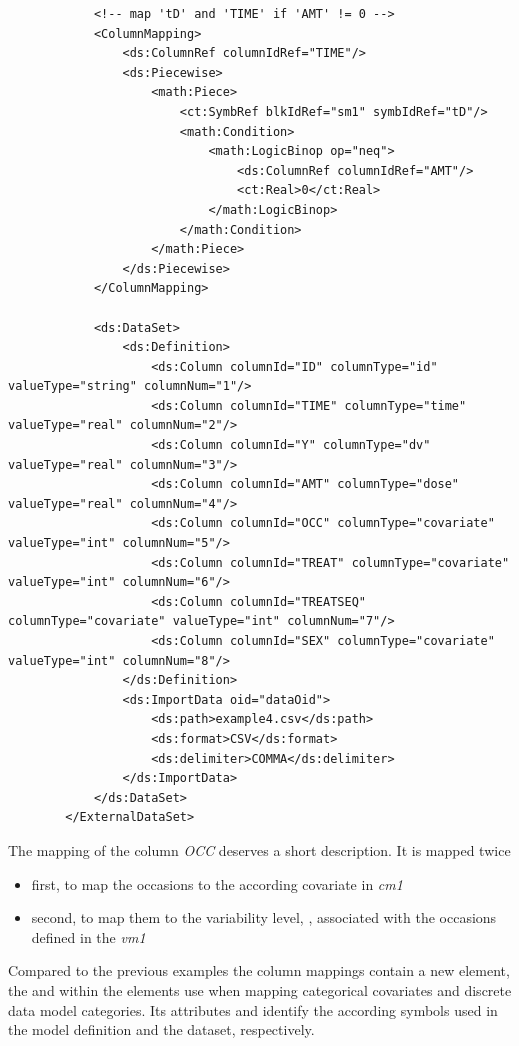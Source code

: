 \begin{lstlisting}
            <!-- map 'tD' and 'TIME' if 'AMT' != 0 -->
            <ColumnMapping>
                <ds:ColumnRef columnIdRef="TIME"/>
                <ds:Piecewise>
                    <math:Piece>
                        <ct:SymbRef blkIdRef="sm1" symbIdRef="tD"/>
                        <math:Condition>
                            <math:LogicBinop op="neq">
                                <ds:ColumnRef columnIdRef="AMT"/>
                                <ct:Real>0</ct:Real>
                            </math:LogicBinop>
                        </math:Condition>
                    </math:Piece>
                </ds:Piecewise>
            </ColumnMapping>

            <ds:DataSet>
                <ds:Definition>
                    <ds:Column columnId="ID" columnType="id" valueType="string" columnNum="1"/>
                    <ds:Column columnId="TIME" columnType="time" valueType="real" columnNum="2"/>
                    <ds:Column columnId="Y" columnType="dv" valueType="real" columnNum="3"/>
                    <ds:Column columnId="AMT" columnType="dose" valueType="real" columnNum="4"/>
                    <ds:Column columnId="OCC" columnType="covariate" valueType="int" columnNum="5"/>
                    <ds:Column columnId="TREAT" columnType="covariate" valueType="int" columnNum="6"/>
                    <ds:Column columnId="TREATSEQ" columnType="covariate" valueType="int" columnNum="7"/>
                    <ds:Column columnId="SEX" columnType="covariate" valueType="int" columnNum="8"/>
                </ds:Definition>
                <ds:ImportData oid="dataOid">
                    <ds:path>example4.csv</ds:path>
                    <ds:format>CSV</ds:format>
                    <ds:delimiter>COMMA</ds:delimiter>
                </ds:ImportData>
            </ds:DataSet>
        </ExternalDataSet>
\end{lstlisting}
The mapping of the column \emph{OCC} deserves a short description. It is mapped twice
\begin{itemize}
\item
first, to map the occasions to the according covariate in  \emph{cm1}
\item
second, to map them to the variability level, , associated with the occasions defined
in the  \emph{vm1}
\end{itemize}
Compared to the previous examples the column mappings contain a new 
element, the  and within the  elements 
use when mapping categorical covariates and discrete data model categories. 
Its attributes  and  identify the according 
symbols used in the model definition and the dataset, respectively.
 

